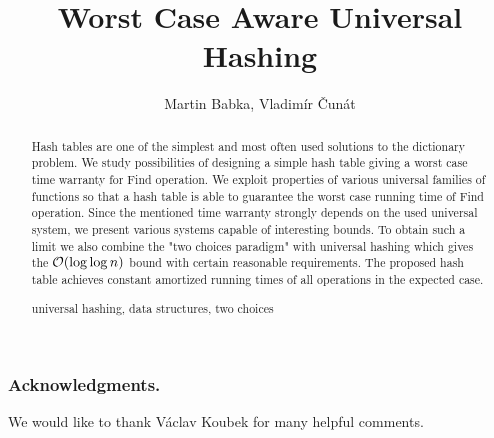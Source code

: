 \documentclass[runningheads,a4paper]{llncs}
\newcommand{\keywords}[1]{\par\addvspace\baselineskip
\noindent\keywordname\enspace\ignorespaces#1}
\begin{document}
\mainmatter

\author{Martin Babka, Vladimír Čunát}

\title{Worst Case Aware Universal Hashing}



\maketitle

\begin{abstract}
Hash tables are one of the simplest and most often used solutions to the dictionary problem. 
We study possibilities of designing a simple hash table giving a worst case time warranty for Find operation.
We exploit properties of various universal families of functions so that a hash table is able to guarantee the worst case running time of Find operation.
Since the mentioned time warranty strongly depends on the used universal system, we present various systems capable of interesting bounds.
To obtain such a limit we also combine the "two choices paradigm" with universal hashing which gives the $\mathcal{O}(\log \log n)$ bound with certain reasonable requirements.
The proposed hash table achieves constant amortized running times of all operations in the expected case.

\keywords{universal hashing, data structures, two choices}
\end{abstract}






\subsubsection*{Acknowledgments.}
We would like to thank Václav Koubek for many helpful comments.



\clearpage
% 


\end{document}
